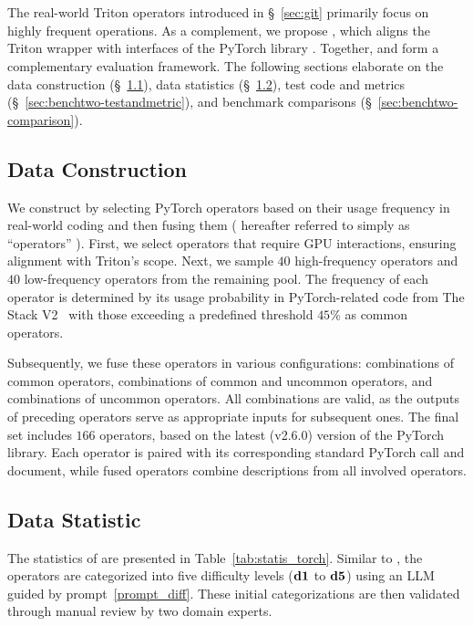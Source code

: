 \section{\benchtwo}
The real-world Triton operators introduced in \S~\ref{sec:git} primarily focus on highly frequent operations. 
As a complement, we propose \benchtwo, which aligns the Triton wrapper with interfaces of the PyTorch library \cite{paszke2019pytorch}. 
Together, \benchone and \benchtwo form a complementary evaluation framework.
The following sections elaborate on the data construction (\S~\ref{sec:benchtwo-construction}), data statistics (\S~\ref{sec:benchtwo-datastatistic}), test code and metrics (\S~\ref{sec:benchtwo-testandmetric}), and  benchmark comparisons (\S~\ref{sec:benchtwo-comparison}). 


\subsection{Data Construction}
\label{sec:benchtwo-construction}
We construct \benchtwo by selecting PyTorch operators based on their usage frequency in real-world coding and then fusing them ( hereafter referred to simply as ``operators'' ). 
First, we select operators that require GPU interactions, ensuring alignment with Triton's scope.
Next, we sample $40$ high-frequency operators and $40$ low-frequency operators from the remaining pool. 
The frequency of each operator is determined by its usage probability in PyTorch-related code from The Stack V2~\cite{lozhkov2024starcoder} with those exceeding a predefined threshold $45$\% as common operators. 

Subsequently, we fuse these operators in various configurations: combinations of common operators, combinations of common and uncommon operators, and combinations of uncommon operators. 
All combinations are valid, as the outputs of preceding operators serve as appropriate inputs for subsequent ones. 
The final set includes $166$ operators, based on the latest (v2.6.0) version of the PyTorch library. 
Each operator is paired with its corresponding standard PyTorch call and document, while fused operators combine descriptions from all involved operators. 

\subsection{Data Statistic}
\label{sec:benchtwo-datastatistic}
The statistics of \benchtwo are presented in Table~\ref{tab:statis_torch}. 
Similar to \benchone, the operators are categorized into five difficulty levels ($\bf d1$ to $\bf d5$) using an LLM guided by prompt~\ref{prompt_diff}. 
These initial categorizations are then validated through manual review by two domain experts. 

